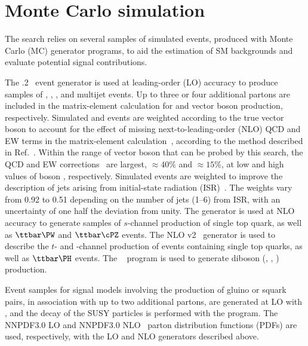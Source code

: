 \section{Monte Carlo simulation}
\label{sec:simulation}

The search relies on several samples of simulated events, produced
with Monte Carlo (MC) generator programs, to aid the estimation of SM
backgrounds and evaluate potential signal contributions.

The .2~\cite{Alwall2014} event generator is used at
leading-order (LO) accuracy to produce samples of \wj, \zj, \ttbar,
and multijet events. Up to three or four additional partons are
included in the matrix-element calculation for \ttbar and vector boson
production, respectively. Simulated \wj and \zj events are weighted
according to the true vector boson \pt to account for the effect of
missing next-to-leading-order (NLO) QCD and EW terms in the
matrix-element calculation~\cite{Alwall2014, Kuhn:2005gv}, according
to the method described in Ref.~\cite{Khachatryan:2016mdm}. Within the
range of vector boson \pt that can be probed by this search, the QCD
and EW corrections~\cite{Kuhn:2005gv} are largest, ${\approx}40\%$ and
${\approx}15\%$, at low and high values of boson \pt,
respectively. Simulated \ttbar events are weighted to improve the
description of jets arising from initial-state radiation
(ISR)~\cite{Chatrchyan:2013xna}. The weights vary from 0.92 to 0.51
depending on the number of jets (1--6) from ISR, with an uncertainty
of one half the deviation from unity. The \MGvATNLO generator is used
at NLO accuracy to generate samples of $s$-channel production of
single top quark, as well as $\ttbar\PW$ and $\ttbar\cPZ$ events. The
NLO \POWHEG v2~\cite{powheg, powheg_top_Wt} generator is used to
describe the $t$- and \PW\cPqt-channel production of events containing
single top quarks, as well as $\ttbar\PH$ events. The ~\cite{pythia} program is used to generate diboson (\PW\PW,
\PW\cPZ, \cPZ\cPZ) production.

Event samples for signal models involving the production of gluino or
squark pairs, in association with up to two additional partons, are
generated at LO with \MGvATNLO, and the decay of the SUSY particles is
performed with the \PYTHIA program. The \textsc{NNPDF}3.0 LO and
\textsc{NNPDF}3.0 NLO~\cite{nnpdf} parton distribution functions
(PDFs) are used, respectively, with the LO and NLO generators
described above.

